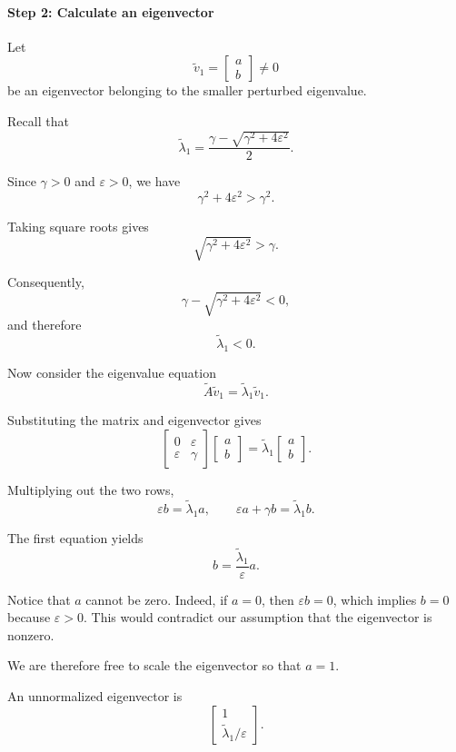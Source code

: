 \documentclass[14pt,letterpaper]{article}
\theoremstyle{plain}
\theoremstyle{definition}
\theoremstyle{remark}
\begin{document}
\paragraph{Step 2: Calculate an eigenvector}

Let
\[
\widetilde v_1=
\begin{bmatrix}a\\b\end{bmatrix}\neq0
\]
be an eigenvector belonging to the smaller perturbed eigenvalue.

Recall that
\[
\widetilde\lambda_1
=
\frac{\gamma-\sqrt{\gamma^2+4\varepsilon^2}}{2}.
\]

Since $\gamma>0$ and $\varepsilon>0$, we have
\[
\gamma^2+4\varepsilon^2>\gamma^2.
\]

Taking square roots gives
\[
\sqrt{\gamma^2+4\varepsilon^2}>\gamma.
\]

Consequently,
\[
\gamma-\sqrt{\gamma^2+4\varepsilon^2}<0,
\]
and therefore
\[
\boxed{\widetilde\lambda_1<0.}
\]

Now consider the eigenvalue equation
\[
\widetilde A\widetilde v_1
=
\widetilde\lambda_1\widetilde v_1.
\]

Substituting the matrix and eigenvector gives
\[
\begin{bmatrix}
0&\varepsilon\\
\varepsilon&\gamma
\end{bmatrix}
\begin{bmatrix}a\\b\end{bmatrix}
=
\widetilde\lambda_1
\begin{bmatrix}a\\b\end{bmatrix}.
\]

Multiplying out the two rows,
\[
\boxed{
\varepsilon b=\widetilde\lambda_1 a,
\qquad
\varepsilon a+\gamma b=\widetilde\lambda_1 b.
}
\]

The first equation yields
\[
b=\frac{\widetilde\lambda_1}{\varepsilon}a.
\]

Notice that $a$ cannot be zero. Indeed, if $a=0$,
then $\varepsilon b=0$, which implies $b=0$
because $\varepsilon>0$. This would contradict
our assumption that the eigenvector is nonzero.

We are therefore free to scale the eigenvector
so that $a=1$.

An unnormalized eigenvector is
\[
\begin{bmatrix}
1\\
\widetilde\lambda_1/\varepsilon
\end{bmatrix}.
\]
\end{document}
